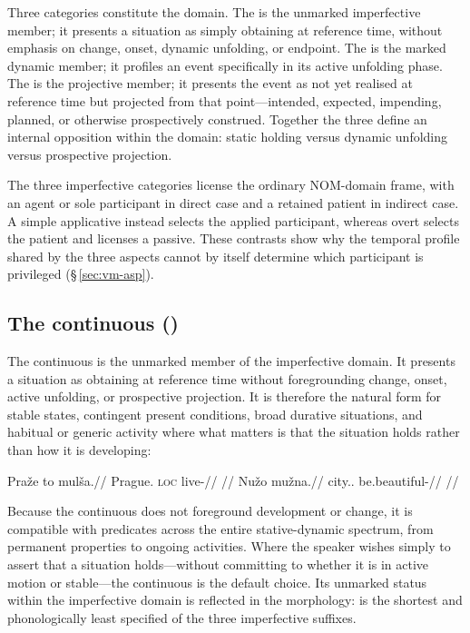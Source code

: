 Three categories constitute the domain. The  is the unmarked
imperfective member; it presents a situation as simply obtaining at reference
time, without emphasis on change, onset, dynamic unfolding, or endpoint. The
 is the marked dynamic member; it profiles an event
specifically in its active unfolding phase. The  is the
projective member; it presents the event as not yet realised at reference time
but projected from that point---intended, expected, impending, planned, or
otherwise prospectively construed. Together the three define an internal
opposition within the domain: static holding versus dynamic unfolding versus
prospective projection.

The three imperfective categories license the ordinary NOM-domain frame,
with an agent or sole participant in direct case and a retained patient in
indirect case. A simple applicative instead selects the applied participant,
whereas overt  selects the patient and licenses a passive. These
contrasts show why the temporal profile shared by the three aspects cannot by
itself determine which participant is privileged (§\,\ref{sec:vm-asp}).

\subsection{The continuous ()}
The continuous is the unmarked member of the imperfective domain. It presents
a situation as obtaining at reference time without foregrounding change, onset,
active unfolding, or prospective projection. It is therefore the natural form
for stable states, contingent present conditions, broad durative situations, and
habitual or generic activity where what matters is that the situation holds
rather than how it is developing:

\pex
\a
\begingl
\gla Praže to mulša.//
\glb Prague.\Ind{} \textsc{loc} live-\Cont{}//
\glft {} //
\endgl
\a
\begingl
\gla Nužo mužna.//
\glb city.\Dir{}.\Def{} be.beautiful-\Cont{}//
\glft {} //
\endgl
\xe

Because the continuous does not foreground development or change, it is
compatible with predicates across the entire stative-dynamic spectrum, from
permanent properties to ongoing activities. Where the speaker wishes simply to
assert that a situation holds---without committing to whether it is in active
motion or stable---the continuous is the default choice. Its unmarked status
within the imperfective domain is reflected in the morphology:  is the
shortest and phonologically least specified of the three imperfective suffixes.

